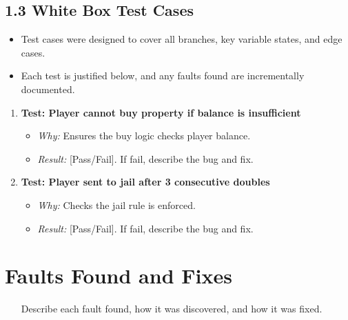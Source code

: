 \documentclass{article}
\begin{document}
\subsection*{1.3 White Box Test Cases}

\begin{itemize}
  \item Test cases were designed to cover all branches, key variable states, and edge cases.
  \item Each test is justified below, and any faults found are incrementally documented.
\end{itemize}

\begin{enumerate}[label=Test Case \arabic*]
  \item \textbf{Test: Player cannot buy property if balance is insufficient}
    \begin{itemize}
      \item \textit{Why:} Ensures the buy logic checks player balance.
      \item \textit{Result:} [Pass/Fail]. If fail, describe the bug and fix.
    \end{itemize}
  \item \textbf{Test: Player sent to jail after 3 consecutive doubles}
    \begin{itemize}
      \item \textit{Why:} Checks the jail rule is enforced.
      \item \textit{Result:} [Pass/Fail]. If fail, describe the bug and fix.
    \end{itemize}
\end{enumerate}

\section*{Faults Found and Fixes}

\begin{enumerate}[label=Fault \arabic*]
  \item [Describe each fault found, how it was discovered, and how it was fixed.]
\end{enumerate}
\end{document}
